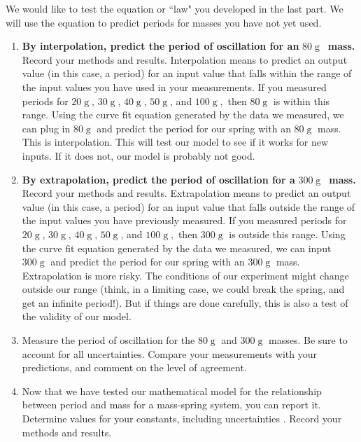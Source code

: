 \documentclass[twoside,11pt,ShortChapTitles]{BYUTextbook}
\begin{document}
We would like to test the equation or  ``law" you developed in the last part. We will use the equation to predict periods
for masses you have not yet used.

\begin{enumerate}
\item \textbf{By interpolation, predict the period of oscillation for an }$80
\operatorname{g}
$\textbf{\ mass.} Record your methods and results. Interpolation means to
predict an output value (in this case, a period) for an input value that falls
within the range of the input values you have used in your measurements. If
you measured periods for $20
\operatorname{g}
$, $30
\operatorname{g}
$, $40
\operatorname{g}
$, $50
\operatorname{g}
$, and $100
\operatorname{g}
,$ then $80
\operatorname{g}
$ is within this range. Using the curve fit equation generated by the data we
measured, we can plug in $80
\operatorname{g}
$ and predict the period for our spring with an $80
\operatorname{g}
$ mass. This is interpolation. This will test our model to see if it works for
new inputs. If it does not, our model is probably not good.

\item \textbf{By extrapolation, predict the period of oscillation for a }$300
\operatorname{g}
$\textbf{\ mass.} Record your methods and results. Extrapolation means to
predict an output value (in this case, a period) for an input value that falls
outside the range of the input values you have previously measured. If you
measured periods for $20
\operatorname{g}
$, $30
\operatorname{g}
$, $40
\operatorname{g}
$, $50
\operatorname{g}
$, and $100
\operatorname{g}
,$ then $300
\operatorname{g}
$ is outside this range. Using the curve fit equation generated by the data we
measured, we can input $300
\operatorname{g}
$ and predict the period for our spring with an $300
\operatorname{g}
$ mass. Extrapolation is more risky. The conditions of our experiment might
change outside our range (think, in a limiting case, we could break the
spring, and get an infinite period!). But if things are done carefully, this
is also a test of the validity of our model.

\item Measure the period of oscillation for the $80
\operatorname{g}
$ and $300
\operatorname{g}
$ masses. Be sure to account for all uncertainties. Compare your measurements
with your predictions, and comment on the level of agreement.

\item Now that we have tested our mathematical model for the relationship
between period and mass for a mass-spring system, you can report it. Determine
values for your constants, including uncertainties . Record your methods and results.
\end{enumerate}
\end{document}
